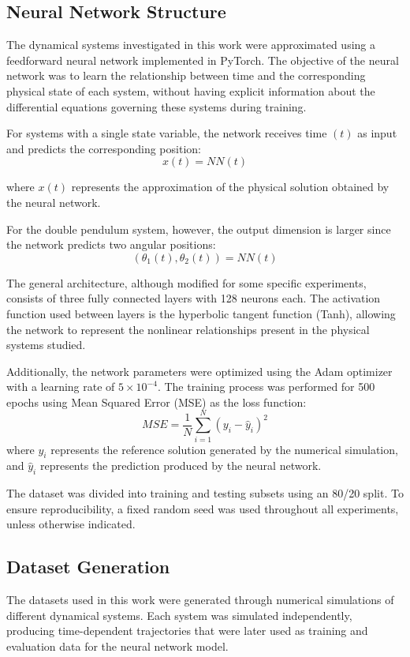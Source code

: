 \subsection{Neural Network Structure}
The dynamical systems investigated in this work were approximated using a feedforward neural network implemented in PyTorch. The objective of the neural network was to learn the relationship between time and the corresponding physical state of each system, without having explicit information about the differential equations governing these systems during training.

For systems with a single state variable, the network receives time $(t)$ as input and predicts the corresponding position:
\begin{equation}
x(t)=NN(t)
\end{equation}

where $x(t)$ represents the approximation of the physical solution obtained by the neural network.

For the double pendulum system, however, the output dimension is larger since the network predicts two angular positions:
\begin{equation}
(\theta_1(t),\theta_2(t))=NN(t)
\end{equation}

The general architecture, although modified for some specific experiments, consists of three fully connected layers with 128 neurons each. The activation function used between layers is the hyperbolic tangent function (Tanh), allowing the network to represent the nonlinear relationships present in the physical systems studied.

Additionally, the network parameters were optimized using the Adam optimizer \cite{kingma2015adam} with a learning rate of $5 \times 10^{-4}$. The training process was performed for 500 epochs using Mean Squared Error (MSE) as the loss function:
\begin{equation}
MSE=\frac{1}{N}\sum_{i=1}^{N}(y_i-\hat{y}_i)^2
\end{equation}
where $y_i$ represents the reference solution generated by the numerical simulation, and $\hat{y}_i$ represents the prediction produced by the neural network.


The dataset was divided into training and testing subsets using an 80/20 split. To ensure reproducibility, a fixed random seed was used throughout all experiments, unless otherwise indicated.


\subsection{Dataset Generation}
The datasets used in this work were generated through numerical simulations of different dynamical systems. Each system was simulated independently, producing time-dependent trajectories that were later used as training and evaluation data for the neural network model.


